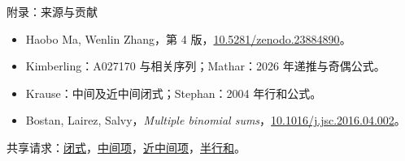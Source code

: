 \documentclass{beamer}
\begin{document}
\begin{frame}{附录：来源与贡献}
\small
\begin{itemize}
\item Haobo Ma, Wenlin Zhang，第 4 版，\href{https://doi.org/10.5281/zenodo.23884890}{10.5281/zenodo.23884890}。
\item Kimberling：A027170 与相关序列；Mathar：2026 年递推与奇偶公式。
\item Krause：中间及近中间闭式；Stephan：2004 年行和公式。
\item Bostan, Lairez, Salvy，\emph{Multiple binomial sums}，\href{https://doi.org/10.1016/j.jsc.2016.04.002}{10.1016/j.jsc.2016.04.002}。
\end{itemize}
共享请求：\href{https://github.com/the-omega-institute/trureturing-requests/issues/253}{闭式}，\href{https://github.com/the-omega-institute/trureturing-requests/issues/254}{中间项}，\href{https://github.com/the-omega-institute/trureturing-requests/issues/255}{近中间项}，\href{https://github.com/the-omega-institute/trureturing-requests/issues/256}{半行和}。
\end{frame}
\FormalVerification
\end{document}
